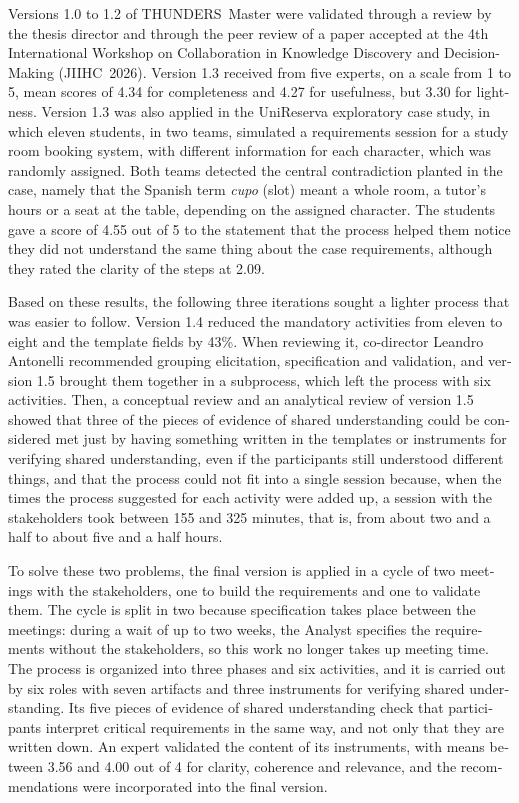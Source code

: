 \documentclass[12pt,letterpaper,oneside]{report}
\begin{document}
\begin{otherlanguage}{english}
Versions 1.0 to 1.2 of THUNDERS~Master were validated through a review by the
thesis director and through the peer review of a paper accepted at the 4th
International Workshop on Collaboration in Knowledge Discovery and
Decision-Making (JIIHC~2026). Version 1.3 received from five experts, on a scale
from 1 to 5, mean scores of 4.34 for completeness and 4.27 for usefulness, but
3.30 for lightness. Version 1.3 was also applied in the UniReserva exploratory
case study, in which eleven students, in two teams, simulated a requirements
session for a study room booking system, with different information for each
character, which was randomly assigned. Both teams detected the central
contradiction planted in the case, namely that the Spanish term \textit{cupo}
(slot) meant a whole room, a tutor's hours or a seat at the table, depending on
the assigned character. The students gave a score of 4.55 out of 5 to the
statement that the process helped them notice they did not understand the same
thing about the case requirements, although they rated the clarity of the steps
at 2.09.

Based on these results, the following three iterations sought a lighter process
that was easier to follow. Version 1.4 reduced the mandatory activities from
eleven to eight and the template fields by 43\%. When reviewing it, co-director
Leandro Antonelli recommended grouping elicitation, specification and
validation, and version 1.5 brought them together in a subprocess, which left
the process with six activities. Then, a conceptual review and an analytical
review of version 1.5 showed that three of the pieces of evidence of shared
understanding could be considered met just by having something written in the
templates or instruments for verifying shared understanding, even if the
participants still understood different things, and that the process could not
fit into a single session because, when the times the process suggested for each
activity were added up, a session with the stakeholders took between 155 and 325
minutes, that is, from about two and a half to about five and a half hours.

To solve these two problems, the final version is applied in a cycle of two
meetings with the stakeholders, one to build the requirements and one to
validate them. The cycle is split in two because specification takes place
between the meetings: during a wait of up to two weeks, the Analyst specifies
the requirements without the stakeholders, so this work no longer takes up
meeting time. The process is organized into three phases and six activities, and
it is carried out by six roles with seven artifacts and three instruments for
verifying shared understanding. Its five pieces of evidence of shared
understanding check that participants interpret critical requirements in the
same way, and not only that they are written down. An expert validated the
content of its instruments, with means between 3.56 and 4.00 out of 4 for
clarity, coherence and relevance, and the recommendations were incorporated into
the final version.


\end{otherlanguage}
\end{document}
